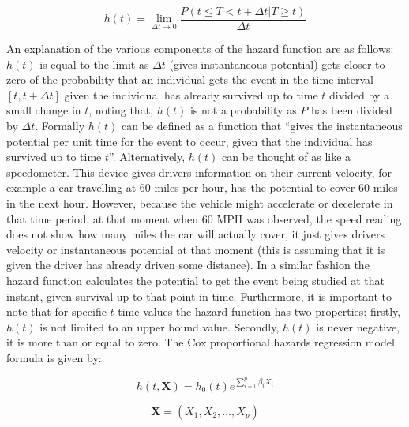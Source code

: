 \documentclass[12pt,twoside]{reedthesis}
\begin{document}
\[h(t)=\lim _{\Delta t \rightarrow 0} \frac{P(t \leq T<t+\Delta t | T \geq t)}{\Delta t}\]

An explanation of the various components of the hazard function are as follows: \(\mathit{h(t)}\) is equal to the limit as \(\mathit\Delta t\) (gives instantaneous potential) gets closer to zero of the probability that an individual gets the event in the time interval \([t, t+\Delta t]\) given the individual has already survived up to time \(\textit{t}\) divided by a small change in \(\textit{t}\), noting that, \(\mathit{h(t)}\) is not a probability as \(\textit{P}\) has been divided by \(\mathit\Delta t\).
Formally \(\mathit{h(t)}\) can be defined as a function that ``gives the instantaneous potential per unit time for the event to occur, given that the individual has survived up to time \(\textit{t}\)''. Alternatively, \(\mathit{h(t)}\) can be thought of as like a speedometer. This device gives drivers information on their current velocity, for example a car travelling at 60 miles per hour, has the potential to cover 60 miles in the next hour. However, because the vehicle might accelerate or decelerate in that time period, at that moment when 60 MPH was observed, the speed reading does not show how many miles the car will actually cover, it just gives drivers velocity or instantaneous potential at that moment (this is assuming that it is given the driver has already driven some distance).
In a similar fashion the hazard function calculates the potential to get the event being studied at that instant, given survival up to that point in time. Furthermore, it is important to note that for specific \(\textit{t}\) time values the hazard function has two properties: firstly, \(\mathit{h(t)}\) is not limited to an upper bound value. Secondly, \(\mathit{h(t)}\) is never negative, it is more than or equal to zero.
The Cox proportional hazards regression model formula is given by:

\[h(t, \mathbf{X})=h_{0}(t) e^{\sum_{i=1}^{p} \beta_{i} X_{i}}\]

\[\mathbf{X}=\left(X_{1}, X_{2}, \dots, X_{p}\right)\]
\end{document}
